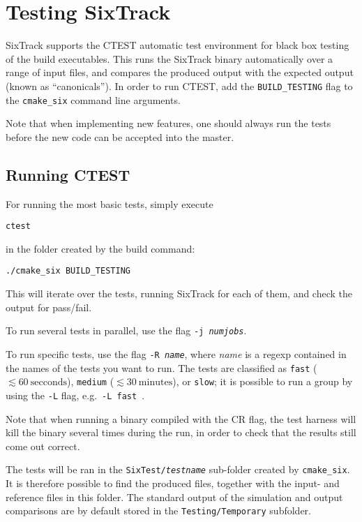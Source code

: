 \documentclass[english,BCOR=0mm,DIV=18]{scrartcl}
\begin{document}
\section{Testing SixTrack}

SixTrack supports the CTEST automatic test environment for black box testing of the build executables.
This runs the SixTrack binary automatically over a range of input files, and compares the produced output with the expected output (known as ``canonicals'').
In order to run CTEST, add the \texttt{BUILD\_TESTING} flag to the \texttt{cmake\_six} command line arguments.

Note that when implementing new features, one should always run the tests before the new code can be accepted into the master.

\subsection{Running CTEST}
For running the most basic tests, simply execute
\begin{lstlisting}
ctest
\end{lstlisting}
in the folder created by the build command:
\begin{lstlisting}
./cmake_six BUILD_TESTING
\end{lstlisting}
This will iterate over the tests, running SixTrack for each of them, and check the output for pass/fail.

To run several tests in parallel, use the flag \texttt{-j \textit{numjobs}}.

To run specific tests, use the flag \texttt{-R \textit{name}}, where \textit{name} is a regexp contained in the names of the tests you want to run.
The tests are classified as \texttt{fast} ($\lesssim 60~\mathrm{secconds}$), \texttt{medium} ($\lesssim 30~\mathrm{minutes}$), or \texttt{slow}; it is possible to run a group by using the \texttt{-L} flag, e.g.\ \texttt{-L fast}~.

Note that when running a binary compiled with the CR flag, the test harness will kill the binary several times during the run, in order to check that the results still come out correct.

The tests will be ran in the \texttt{SixTest/\textit{testname}} sub-folder created by \texttt{cmake\_six}.
It is therefore possible to find the produced files, together with the input- and reference files in this folder.
The standard output of the simulation and output comparisons are by default stored in the \texttt{Testing/Temporary} subfolder.
\end{document}
